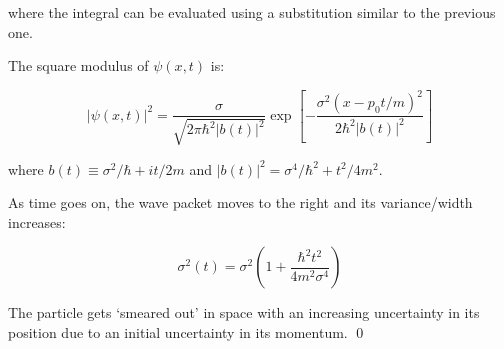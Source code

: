 \documentclass[12pt]{article}
\begin{document}
where the integral can be evaluated using a substitution similar to the previous one.

The square modulus of $\psi(x, t)$ is:

\begin{equation}
    \left| \psi(x, t) \right|^{2} = \frac{\sigma}{\sqrt{2\pi \hbar^{2} \left\lvert b(t) \right\rvert^{2}}} \exp \left[ -\frac{\sigma^{2} (x - p_{0}t/m)^{2}}{2\hbar^{2} \left\lvert b(t) \right\rvert^{2}} \right]
\end{equation}

where $b(t) \equiv \sigma^{2}/\hbar + it/2m$ and $\left\lvert b(t) \right\rvert^{2} = \sigma^{4}/\hbar^{2} + t^{2}/4m^{2}$.

As time goes on, the wave packet moves to the right and its variance/width increases:

\begin{equation}
    \sigma^{2}(t) = \sigma^{2} \left( 1 + \frac{\hbar^{2}t^{2}}{4m^{2}\sigma^{4}} \right)
\end{equation}

The particle gets `smeared out' in space with an increasing uncertainty in its position due to an initial uncertainty in its momentum.
\qed
\end{document}
